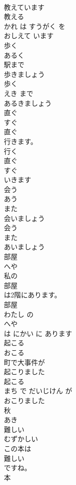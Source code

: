 \documentclass[8pt]{extreport}
\begin{document}
\begin{CJK}{UTF8}{min}
\\	教えています
\\	教える 
\\	かれ は すうがく を 
\\	おしえて います
\\	歩く	
\\	あるく	
\\	駅まで
\\	歩きましょう
\\	歩く 
\\	えき まで 
\\	あるきましょう
\\	直ぐ	
\\	すぐ	
\\	直ぐ
\\	行きます。	
\\	行く 
\\	直ぐ 
\\	すぐ
\\	いきます	
\\	会う	
\\	あう	
\\	また
\\	会いましょう
\\	会う 
\\	また 
\\	あいましょう
\\	部屋	
\\	へや	
\\	私の
\\	部屋
\\	は2階にあります。	
\\	部屋 
\\	わたし の 
\\	へや
\\	は にかい に あります	
\\	起こる	
\\	おこる	
\\	町で大事件が
\\	起こりました
\\	起こる 
\\	まち で だいじけん が 
\\	おこりました
\\	秋	
\\	あき	
\\	難しい	
\\	むずかしい	
\\	この本は
\\	難しい
\\	ですね。	
\\	本 

\end{CJK}
\end{document}
